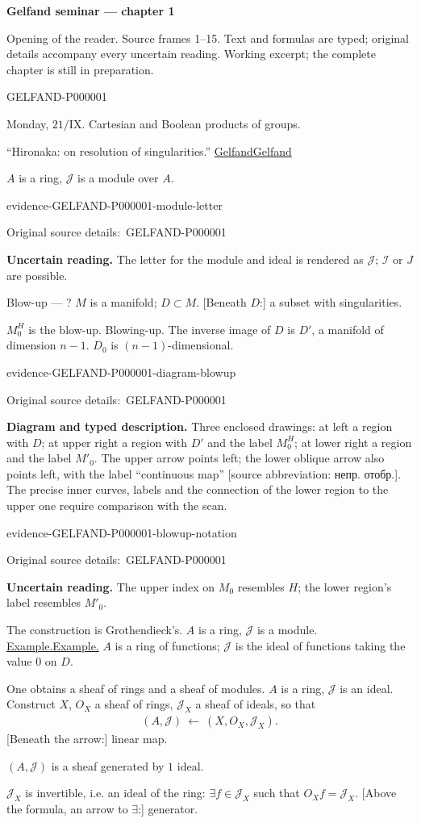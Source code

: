\documentclass[11pt]{article}
\let\MathUnderline\underline
\renewcommand{\underline}[1]{\ifmmode\MathUnderline{#1}\else\uline{#1}\fi}
\newcommand{\SourcePage}[2]{\par\smallskip\phantomsection\label{#1:source-page}{\small\sffamily\color{blue!55!black}#1}\par\smallskip}
\newcommand{\EvidenceBlock}[4]{%
 \par\smallskip\noindent\begin{minipage}{\linewidth}
 \begin{minipage}[t]{.47\linewidth}\vspace{0pt}\centering
 \csname evidence-#1-#2\endcsname\par
 {\scriptsize\SourceCropCaption\ #1}\par
 \end{minipage}\hfill
 \begin{minipage}[t]{.49\linewidth}\vspace{0pt}\raggedright
 {\small\color{orange!65!black}\textbf{#4} #3}\par
 \end{minipage}
 \end{minipage}\par\smallskip}
\newcommand{\Unclear}[3]{\EvidenceBlock{#1}{#2}{#3}{\ReadingCaption}}
\newcommand{\SourceFigure}[3]{\EvidenceBlock{#1}{#2}{#3}{\DiagramCaption}}
\newcommand{\SourceCropCaption}{Original source details:}\newcommand{\ReadingCaption}{Uncertain reading.}\newcommand{\IncompleteCaption}{Undeciphered passage.}\newcommand{\DiagramCaption}{Diagram and typed description.}
\begin{document}
{\large\bfseries Gelfand seminar — chapter 1}\par
{\small Opening of the reader. Source frames 1–15. Text and formulas are typed; original details accompany every uncertain reading. Working excerpt; the complete chapter is still in preparation.}\par\medskip
\SourcePage{GELFAND-P000001}{unlabelled}
Monday, $21/\mathrm{IX}$.
Cartesian and Boolean products of groups.

``Hironaka: on resolution of singularities.''
\underline{Gelfand}

$A$ is a ring, $\mathcal{J}$ is a module over $A$.
\Unclear{GELFAND-P000001}{module-letter}{The letter for the module and ideal is rendered as $\mathcal{J}$; $\mathcal{I}$ or $J$ are possible.}

Blow-up --- ?
$M$ is a manifold; $D\subset M$.
[Beneath $D$:] a subset with singularities.

$M_0^H$ is the blow-up. Blowing-up.
The inverse image of $D$ is $D'$, a manifold of dimension $n-1$.
$D_0$ is $(n-1)$-dimensional.
\SourceFigure{GELFAND-P000001}{diagram-blowup}{Three enclosed drawings: at left a region with $D$; at upper right a region with $D'$ and the label $M_0^H$; at lower right a region and the label $M'_0$. The upper arrow points left; the lower oblique arrow also points left, with the label ``continuous map'' [source abbreviation: непр. отобр.]. The precise inner curves, labels and the connection of the lower region to the upper one require comparison with the scan.}
\Unclear{GELFAND-P000001}{blowup-notation}{The upper index on $M_0$ resembles $H$; the lower region's label resembles $M'_0$.}

The construction is Grothendieck's.
$A$ is a ring, $\mathcal{J}$ is a module.
\underline{Example.} $A$ is a ring of functions;
$\mathcal{J}$ is the ideal of functions taking the value $0$ on $D$.

One obtains a sheaf of rings and a sheaf of modules.
$A$ is a ring, $\mathcal{J}$ is an ideal.
Construct $X$, $O_X$ a sheaf of rings,
$\mathcal{J}_X$ a sheaf of ideals, so that
\begin{gather*}
 (A,\mathcal{J})\ \longleftarrow\ (X,O_X,\mathcal{J}_X).
\end{gather*}
[Beneath the arrow:] linear map.

$(A,\mathcal{J})$ is a sheaf generated by $1$ ideal.

$\mathcal{J}_X$ is invertible, i.e. an ideal of the ring:
$\exists f\in\mathcal{J}_X$ such that $O_Xf=\mathcal{J}_X$.
[Above the formula, an arrow to $\exists$:] generator.
\end{document}
